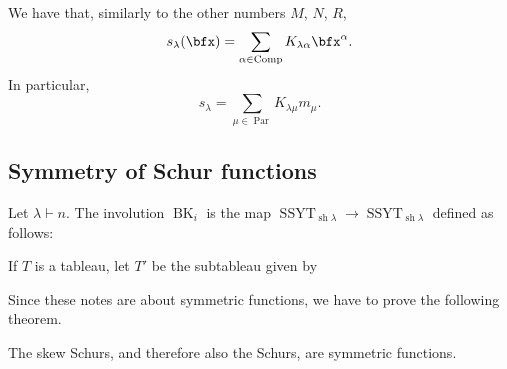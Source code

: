 \documentclass{article}
\DeclareMathOperator{\sh}{sh}
\DeclareMathOperator{\Par}{Par}
\DeclareMathOperator{\Com}{Comp}
\DeclareMathOperator{\SSYT}{SSYT}
\DeclareMathOperator{\BK}{BK}
\begin{document}
\begin{remark}
    We have that, similarly to the other numbers $M$, $N$, $R$,
    \[
        s_\lambda(\bfx)
        = 
        \sum_{\alpha\in\Com} K_{\lambda\alpha}\bfx^\alpha.
    \]
    In particular,
    \[
        s_\lambda
        = 
        \sum_{\mu\in\Par} 
        K_{\lambda\mu}m_\mu.
    \]
\end{remark}

\subsection{Symmetry of Schur functions}


\begin{definition}
    Let $\lambda \vdash n$.
    The  involution $\BK_i$ is the map $\SSYT_{\sh \lambda} \to \SSYT_{\sh \lambda}$ defined as follows:

    If $T$ is a tableau, let $T'$ be the subtableau given by
    
\end{definition}

Since these notes are about symmetric functions, we have to prove the following theorem.

\begin{theorem} 
    The skew Schurs, and therefore also the Schurs, are symmetric functions.
\end{theorem}
\end{document}
